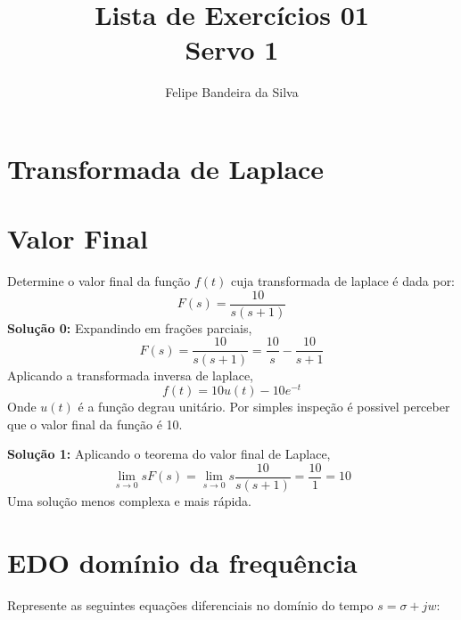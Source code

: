 \documentclass[paper=a4, fontsize=11pt]{article}
\title{Lista de Exercícios 01\\Servo 1}
\author{Felipe Bandeira da Silva}
\date{}
\begin{document}
\maketitle


\newpage

\listoffigures

\newpage
\section{Transformada de Laplace}


\newpage
\section{Valor Final}

Determine o valor final da função $f(t)$ cuja transformada de laplace é dada por:
\begin{equation}
    F(s) = \frac{10}{s(s+1)}
\end{equation}
\textbf{Solução 0:}
Expandindo em frações parciais,
\begin{equation}
    F(s) = \frac{10}{s(s+1)} = \frac{10}{s} - \frac{10}{s+1}
\end{equation}
Aplicando a transformada inversa de laplace,
\begin{equation}
    f(t) = 10 u(t) - 10 e^{-t}
\end{equation}
Onde $u(t)$ é a função degrau unitário. Por simples inspeção é possivel
perceber que o valor final da função é 10.

\textbf{Solução 1:}
Aplicando o teorema do valor final de Laplace,
\begin{equation}
    \lim_{s \to 0}{s F(s)} = \lim_{s \to 0}{s \frac{10}{s(s+1)}} = \frac{10}{1} = 10
\end{equation}
Uma solução menos complexa e mais rápida.

\newpage
\section{EDO domínio da frequência}

Represente as seguintes equações diferenciais no domínio do tempo $s=\sigma + j w$:
\end{document}
